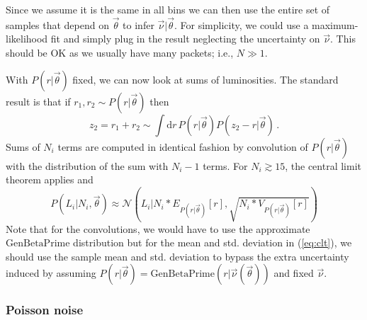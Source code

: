 \documentclass[a4,12pt]{article}
\newcommand{\gaussian}{\ensuremath{\mathcal{N}}}
\newcommand{\genbetapr}{\ensuremath{\mathrm{GenBetaPrime}}}
\newcommand{\Lumi}{\ensuremath{L_i}}
\newcommand{\rmdx}[1]{\mbox{d} #1 \,} %
\newcommand{\vecnu}{\ensuremath{\vec{\nu}}}
\newcommand{\vecth}{\ensuremath{{\vec{\theta}}}}
\def \refeq#1{(\ref{eq:#1})}
\begin{document}
Since we assume it is the same in all bins we can then use the entire
set of samples that depend on $\vecth$ to infer $\vecnu | \vecth$. For
simplicity, we could use a maximum-likelihood fit and simply plug in
the result neglecting the uncertainty on $\vecnu$. This should be OK
as we usually have many packets; i.e., $N \gg 1$.

With $P(r|\vecth)$ fixed, we can now look at sums of luminosities. The
standard result is that if $r_1, r_2 \sim P(r|\vecth)$ then
\begin{equation}
  \label{eq:convolution}
  z_2 = r_1 + r_2 \sim \int \rmdx{r} P(r|\vecth) P(z_2 - r|\vecth) \,.
\end{equation}
Sums of $N_i$ terms are computed in identical fashion by convolution
of $P(r|\vecth)$ with the distribution of the sum with $N_i-1$
terms. For $N_i \gtrsim 15$, the central limit theorem applies and
\begin{equation}
  \label{eq:clt}
  P(\Lumi | N_i, \vecth) \approx \gaussian \left(\Lumi | N_i * E_{P(r|\vecth)}[r], \sqrt{N_i * V_{P(r|\vecth)}[r]} \right)
\end{equation}
Note that for the convolutions, we would have to use the approximate
\genbetapr{} distribution but for the mean and std. deviation in
\refeq{clt}, we should use the sample mean and std. deviation to
bypass the extra uncertainty induced by assuming $P(r | \vecth) =
\genbetapr(r | \vecnu(\vecth))$ and fixed $\vecnu$.

\subsubsection{Poisson noise}
\end{document}
